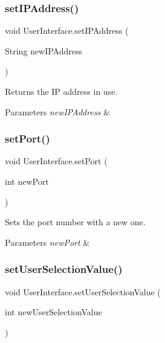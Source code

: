 \subsubsection{\texorpdfstring{set\+I\+P\+Address()}{setIPAddress()}}
{\footnotesize\ttfamily void User\+Interface.\+set\+I\+P\+Address (\begin{DoxyParamCaption}\item[{String}]{new\+I\+P\+Address }\end{DoxyParamCaption})\hspace{0.3cm}{\ttfamily [inline]}}

Returns the IP address in use. 
\begin{DoxyParams}{Parameters}
{\em new\+I\+P\+Address} & \\
\hline
\end{DoxyParams}
\mbox{\label{class_user_interface_af822b7fc2dbee940ad4892bd2e27d5ae}} 
\subsubsection{\texorpdfstring{set\+Port()}{setPort()}}
{\footnotesize\ttfamily void User\+Interface.\+set\+Port (\begin{DoxyParamCaption}\item[{int}]{new\+Port }\end{DoxyParamCaption})\hspace{0.3cm}{\ttfamily [inline]}}

Sets the port number with a new one. 
\begin{DoxyParams}{Parameters}
{\em new\+Port} & \\
\hline
\end{DoxyParams}
\mbox{\label{class_user_interface_ae26a8337ddbf851a470c112df194a768}} 
\subsubsection{\texorpdfstring{set\+User\+Selection\+Value()}{setUserSelectionValue()}}
{\footnotesize\ttfamily void User\+Interface.\+set\+User\+Selection\+Value (\begin{DoxyParamCaption}\item[{int}]{new\+User\+Selection\+Value }\end{DoxyParamCaption})\hspace{0.3cm}{\ttfamily [inline]}}

